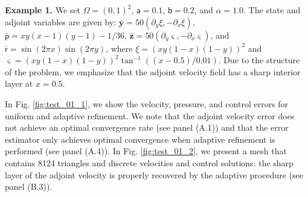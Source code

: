 \documentclass[final]{siamart0216}
\begin{document}
\textbf{Example 1.} We set $\Omega=(0,1)^{2}$, $\mathsf{a}=0.1$, $\mathsf{b}=0.2$, and $\alpha=1.0$. The state and adjoint variables are given by: $\bar{\mathbf{y}}=50( \partial_{y}\xi, -\partial_{x}\xi )$, $\bar{\mathsf{p}}=xy(x - 1)(y - 1) - 1/36$, $\bar{\mathbf{z}}=50( \partial_{y}\varsigma , -\partial_{x}\varsigma )$, and $\bar{\mathsf{r}} =\sin(2\pi x)\sin(2\pi y)$, where $\xi=(xy(1-x)(1-y))^2$ and $\varsigma=(xy(1-x)(1-y))^2\tan^{-1}((x-0.5)/0.01)$. Due to the structure of the problem, we emphasize that the adjoint velocity field has a sharp interior layer at $x=0.5$.

In Fig. \ref{fig:test_01_1}, we show the velocity, pressure, and control errors for uniform and adaptive refinement. We note that the adjoint velocity error does not achieve an optimal convergence rate (see panel (A.1)) and that the error estimator only achieves optimal convergence when adaptive refinement is performed (see panel (A.4)). In Fig. \ref{fig:test_01_2}, we present a mesh that contains 8124 triangles and discrete velocities and control solutions: the sharp layer of the adjoint velocity is properly recovered by the adaptive procedure (see panel (B.3)).   
\end{document}
